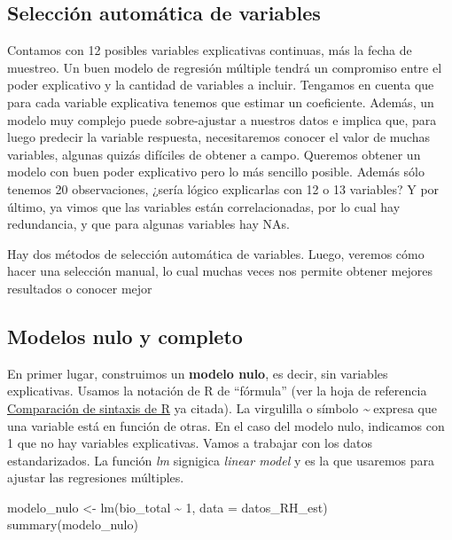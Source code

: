 \documentclass[
]{book}
\newenvironment{Shaded}{\begin{snugshade}}{\end{snugshade}}
\newcommand{\AttributeTok}[1]{\textcolor[rgb]{0.77,0.63,0.00}{#1}}
\newcommand{\DecValTok}[1]{\textcolor[rgb]{0.00,0.00,0.81}{#1}}
\newcommand{\FunctionTok}[1]{\textcolor[rgb]{0.00,0.00,0.00}{#1}}
\newcommand{\NormalTok}[1]{#1}
\newcommand{\OtherTok}[1]{\textcolor[rgb]{0.56,0.35,0.01}{#1}}
\newcommand{\SpecialCharTok}[1]{\textcolor[rgb]{0.00,0.00,0.00}{#1}}
\begin{document}
\hypertarget{selecciuxf3n-automuxe1tica-de-variables}{%
\subsection{Selección automática de variables}\label{selecciuxf3n-automuxe1tica-de-variables}}

Contamos con 12 posibles variables explicativas continuas, más la fecha de muestreo. Un buen modelo de regresión múltiple tendrá un compromiso entre el poder explicativo y la cantidad de variables a incluir. Tengamos en cuenta que para cada variable explicativa tenemos que estimar un coeficiente. Además, un modelo muy complejo puede sobre-ajustar a nuestros datos e implica que, para luego predecir la variable respuesta, necesitaremos conocer el valor de muchas variables, algunas quizás difíciles de obtener a campo. Queremos obtener un modelo con buen poder explicativo pero lo más sencillo posible. Además sólo tenemos 20 observaciones, ¿sería lógico explicarlas con 12 o 13 variables? Y por último, ya vimos que las variables están correlacionadas, por lo cual hay redundancia, y que para algunas variables hay NAs.

Hay dos métodos de selección automática de variables. Luego, veremos cómo hacer una selección manual, lo cual muchas veces nos permite obtener mejores resultados o conocer mejor

\hypertarget{modelos-nulo-y-completo}{%
\subsection{Modelos nulo y completo}\label{modelos-nulo-y-completo}}

En primer lugar, construimos un \textbf{modelo nulo}, es decir, sin variables explicativas. Usamos la notación de R de ``fórmula'' (ver la hoja de referencia \href{https://raw.githubusercontent.com/rstudio/cheatsheets/main/translations/spanish/syntax_es.pdf}{Comparación de sintaxis de R} ya citada). La virgulilla o símbolo \emph{\textasciitilde{}} expresa que una variable está en función de otras. En el caso del modelo nulo, indicamos con 1 que no hay variables explicativas. Vamos a trabajar con los datos estandarizados. La función \emph{lm} signigica \emph{linear model} y es la que usaremos para ajustar las regresiones múltiples.

\begin{Shaded}
\begin{Highlighting}[]
\NormalTok{modelo\_nulo }\OtherTok{\textless{}{-}} \FunctionTok{lm}\NormalTok{(bio\_total }\SpecialCharTok{\textasciitilde{}} \DecValTok{1}\NormalTok{, }\AttributeTok{data =}\NormalTok{ datos\_RH\_est)}
\FunctionTok{summary}\NormalTok{(modelo\_nulo)}
\end{Highlighting}
\end{Shaded}
\end{document}

